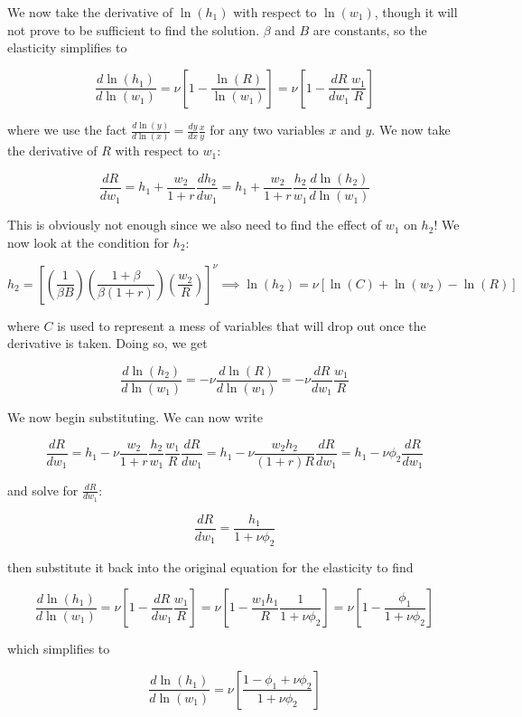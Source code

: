 \documentclass[12pt, letterpaper, parskip = full]{article}
\begin{document}
    We now take the derivative of \(\ln(h_1)\) with respect to \(\ln(w_1)\), though it will not prove to be sufficient to find the solution. \(\beta\) and \(B\) are constants, so the elasticity simplifies to

    \[  \frac{d \ln(h_1)}{d \ln(w_1)} = \nu \left[ 1 - \frac{\ln(R)}{\ln(w_1)} \right] = \nu \left[1 - \frac{dR}{dw_1} \frac{w_1}{R}\right] \]
    
    where we use the fact \( \frac{d \ln(y)}{d \ln(x)} = \frac{dy}{dx} \frac{x}{y}  \) for any two variables \(x\) and \(y\). We now take the derivative of \(R\) with respect to \(w_1\):

    \[ \frac{dR}{dw_1} = h_1 + \frac{w_2}{1+r} \frac{dh_2}{dw_1} = h_1 + \frac{w_2}{1+r} \frac{h_2}{w_1} \frac{d \ln(h_2)}{d \ln(w_1)}  \]

    This is obviously not enough since we also need to find the effect of \(w_1\) on \(h_2\)! We now look at the condition for \(h_2\):

    \[  h_2 = \left[ \left(\frac{1}{\beta B}\right) \left(\frac{1+\beta}{\beta(1+r)}\right) \left( \frac{w_2}{R} \right) \right]^\nu \implies \ln(h_2) = \nu \left[ \ln(C) + \ln(w_2) - \ln(R) \right]  \]

    where \(C\) is used to represent a mess of variables that will drop out once the derivative is taken. Doing so, we get

    \[ \frac{d \ln(h_2)}{d \ln(w_1)} = - \nu \frac{d\ln(R)}{d \ln(w_1)} = - \nu \frac{dR}{dw_1} \frac{w_1}{R}   \]
    
    We now begin substituting. We can now write

    \[ \frac{dR}{dw_1} = h_1 - \nu \frac{w_2}{1+r} \frac{h_2}{w_1} \frac{w_1}{R} \frac{dR}{dw_1} = h_1 - \nu \frac{w_2 h_2}{(1+r) R} \frac{dR}{dw_1} = h_1 - \nu \phi_2 \frac{dR}{dw_1} \]

    and solve for \(\frac{dR}{dw_1}\):

    \[ \frac{dR}{dw_1} = \frac{h_1}{1 + \nu \phi_2}   \]

    then substitute it back into the original equation for the elasticity to find
    
    \[  \frac{d \ln(h_1)}{d \ln(w_1)} = \nu \left[1 - \frac{dR}{dw_1} \frac{w_1}{R}\right] = \nu \left[ 1 - \frac{w_1 h_1}{R} \frac{1}{1 + \nu \phi_2} \right] = \nu \left[1 - \frac{\phi_1}{1 + \nu \phi_2}\right] \]

    which simplifies to 

    \[ \frac{d \ln(h_1)}{d \ln(w_1)} = \nu \left[  \frac{1 - \phi_1 + \nu \phi_2}{1 + \nu \phi_2}\right]  \]
\end{document}
